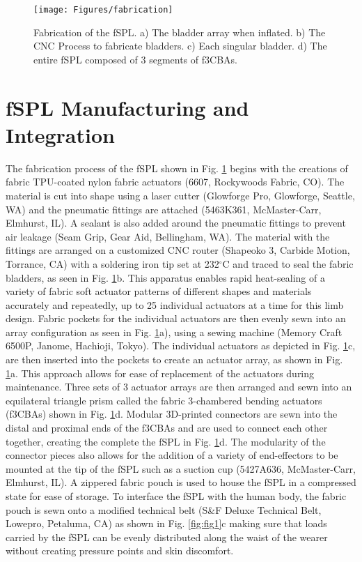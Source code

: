 \documentclass[letterpaper, 10 pt, conference]{ieeeconf}  %
\begin{document}
\begin{figure}[t!]
\centering
\texttt{[image: Figures/fabrication]}
\caption{Fabrication of the fSPL. a) The bladder array when inflated. b) The CNC Process to fabricate bladders. c) Each singular bladder. d) The entire fSPL composed of 3 segments of f3CBAs.}
\label{fig:fabrication}
\vspace{-1.5em}
\end{figure}

\section{fSPL Manufacturing and Integration}


The fabrication process of the fSPL shown in Fig. \ref{fig:fabrication} begins with the creations of fabric TPU-coated nylon fabric actuators (6607, Rockywoods Fabric, CO). The material is cut into shape using a laser cutter (Glowforge Pro, Glowforge, Seattle, WA) and the pneumatic fittings are attached (5463K361, McMaster-Carr, Elmhurst, IL). A sealant is also added around the pneumatic fittings to prevent air leakage (Seam Grip, Gear Aid, Bellingham, WA). The material with the fittings are arranged on a customized CNC router (Shapeoko 3, Carbide Motion, Torrance, CA) with a soldering iron tip set at 232$^{\circ}$C and traced to seal the fabric bladders, as seen in Fig. \ref{fig:fabrication}b. This apparatus enables rapid heat-sealing of a variety of fabric soft actuator patterns of different shapes and materials accurately and repeatedly, up to 25 individual actuators at a time for this limb design. Fabric pockets for the individual actuators are then evenly sewn into an array configuration as seen in Fig. \ref{fig:fabrication}a), using a sewing machine (Memory Craft 6500P, Janome, Hachioji, Tokyo). The individual actuators as depicted in Fig. \ref{fig:fabrication}c, are then inserted into the pockets to create an actuator array, as shown in Fig. \ref{fig:fabrication}a. This approach allows for ease of replacement of the actuators during maintenance. Three sets of 3 actuator arrays are then arranged and sewn into an equilateral triangle prism called the fabric 3-chambered bending actuators (f3CBAs) shown in Fig. \ref{fig:fabrication}d. Modular 3D-printed connectors are sewn into the distal and proximal ends of the f3CBAs and are used to connect each other together, creating the complete the fSPL in Fig. \ref{fig:fabrication}d. The modularity of the connector pieces also allows for the addition of a variety of end-effectors to be mounted at the tip of the fSPL such as a suction cup (5427A636, McMaster-Carr, Elmhurst, IL). A zippered fabric pouch is used to house the fSPL in a compressed state for ease of storage. To interface the fSPL with the human body, the fabric pouch is sewn onto a modified technical belt (S\&F Deluxe Technical Belt, Lowepro, Petaluma, CA) as shown in Fig. \ref{fig:fig1}c making sure that loads carried by the fSPL can be evenly distributed along the waist of the wearer without creating pressure points and skin discomfort. 
% 
% 
% 
% 
\end{document}
